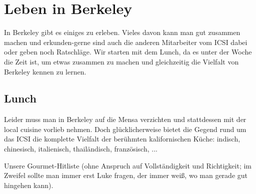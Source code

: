 \documentclass[a4paper]{scrreprt}
\begin{document}
\chapter{Leben in Berkeley}

In Berkeley gibt es einiges zu erleben. Vieles davon kann man gut zusammen machen und erkunden-gerne sind auch die anderen Mitarbeiter vom ICSI dabei oder geben noch Ratschläge. Wir starten mit dem Lunch, da es unter der Woche die Zeit ist, um etwas zusammen zu machen und gleichzeitig die Vielfalt von Berkeley kennen zu lernen.

\section{Lunch}

Leider muss man in Berkeley auf die Mensa verzichten und stattdessen mit der local cuisine vorlieb nehmen. Doch glücklicherweise bietet die Gegend rund um das ICSI die komplette Vielfalt der berühmten kalifornischen Küche: indisch, chinesisch, italienisch, thailändisch, französisch, ...

Unsere Gourmet-Hitliste (ohne Anspruch auf Vollständigkeit und Richtigkeit; im Zweifel sollte man immer erst Luke fragen, der immer weiß, wo man gerade gut hingehen kann).
\end{document}
